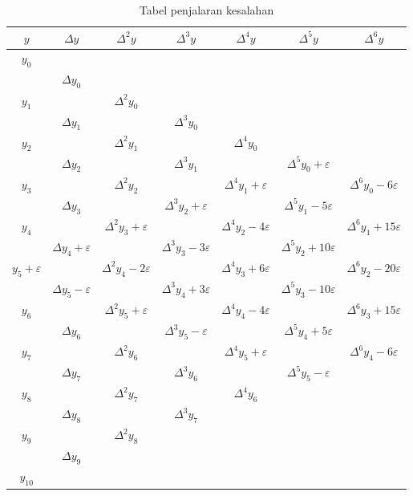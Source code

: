 \begin{table}[!htbp]
\centering
\caption{Tabel penjalaran kesalahan}
\label{tabel:KesalahanTabelBeda}
\begin{tabular}{@{}|c|c|c|c|c|c|c|@{}}
\hline
$y$			& $\Delta y$			& $\Delta^2 y$			& $\Delta^3 y$				& $\Delta^4 y$			& $\Delta^5 y$			& $\Delta^6 y$	\\ \hline
$y_0$			& 				&  				& 					&				&				&		\\
 			& $\Delta y_0$			&  				& 					&				&				&		\\
$y_1$ 			& 				& $\Delta^2 y_0$		& 					&				&				&		\\
 			& $\Delta y_1$			& 				& $\Delta^3 y_0$ 			&				&				&		\\
$y_2$ 			& 				& $\Delta^2 y_1$		& 		 			& $\Delta^4 y_0$		&				&		\\
 			& $\Delta y_2$			& 				& $\Delta^3 y_1$ 			&				& $\Delta^5 y_0 + \varepsilon$	&		\\
$y_3$ 			& 				& $\Delta^2 y_2$		& 		 			& $\Delta^4 y_1 + \varepsilon$	&				& $\Delta^6 y_0 - 6\varepsilon$	\\
 			& $\Delta y_3$			& 				& $\Delta^3 y_2 + \varepsilon$ 		&				& $\Delta^5 y_1 - 5\varepsilon$	&		\\
$y_4$ 			& 				& $\Delta^2 y_3 + \varepsilon$	& 		 			& $\Delta^4 y_2 - 4\varepsilon$	&				& $\Delta^6 y_1 + 15\varepsilon$	\\
 			& $\Delta y_4 + \varepsilon$	& 				& $\Delta^3 y_3 - 3\varepsilon$ 	&				& $\Delta^5 y_2 + 10\varepsilon$	&		\\
$y_5 + \varepsilon$ 	& 				& $\Delta^2 y_4 - 2\varepsilon$	& 		 			& $\Delta^4 y_3 + 6\varepsilon$	&				& $\Delta^6 y_2 - 20\varepsilon$	\\
 			& $\Delta y_5 - \varepsilon$	& 				& $\Delta^3 y_4 + 3\varepsilon$ 	&				& $\Delta^5 y_3 - 10\varepsilon$	&		\\
$y_6$ 			& 				& $\Delta^2 y_5 + \varepsilon$	& 		 			& $\Delta^4 y_4 - 4\varepsilon$	&				& $\Delta^6 y_3 + 15\varepsilon$	\\
 			& $\Delta y_6$			& 				& $\Delta^3 y_5 - \varepsilon$ 		&				& $\Delta^5 y_4 + 5\varepsilon$	&		\\
$y_7$ 			& 				& $\Delta^2 y_6$		& 		 			& $\Delta^4 y_5 + \varepsilon$	&				& $\Delta^6 y_4 - 6\varepsilon$	\\
 			& $\Delta y_7$			& 				& $\Delta^3 y_6$			& 	& $\Delta^5 y_5- \varepsilon$				& 		\\
$y_8$ 			& 				& $\Delta^2 y_7$		& 		 			& $\Delta^4 y_6$		&				&		\\
 			& $\Delta y_8$			& 				& $\Delta^3 y_7$ 			&				&				&		\\
$y_9$ 			& 				& $\Delta^2 y_8$		& 					&				&				&		\\
 			& $\Delta y_9$			&  				& 					&				&				&		\\
$y_{10}$			& 				&  				& 					&				&				&		\\	\hline
\end{tabular}
\end{table}

